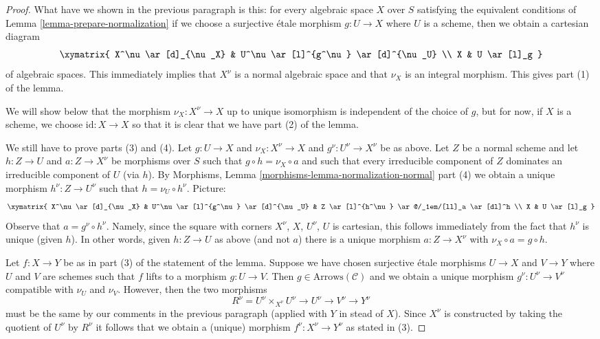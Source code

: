 \begin{proof}
\medskip\noindent
What have we shown in the previous paragraph is this: for every algebraic
space $X$ over $S$ satisfying the equivalent conditions of
Lemma \ref{lemma-prepare-normalization} if we choose a surjective \'etale
morphism $g : U \to X$ where $U$ is a scheme, then we obtain
a cartesian diagram
$$
\xymatrix{
X^\nu \ar[d]_{\nu_X} & U^\nu \ar[l]^{g^\nu} \ar[d]^{\nu_U} \\
X & U \ar[l]_g
}
$$
of algebraic spaces. This immediately implies that $X^\nu$ is a normal
algebraic space and that $\nu_X$ is an integral morphism. This gives
part (1) of the lemma.

\medskip\noindent
We will show below that the morphism $\nu_X : X^\nu \to X$
up to unique isomorphism is independent of the choice of $g$,
but for now, if $X$ is a scheme, we choose $\text{id} : X \to X$
so that it is clear that we have part (2) of the lemma.

\medskip\noindent
We still have to prove parts (3) and (4). Let $g : U \to X$ and
$\nu_X : X^\nu \to X$ and $g^\nu : U^\nu \to X^\nu$ be as above.
Let $Z$ be a normal scheme and let $h : Z \to U$ and $a : Z \to X^\nu$
be morphisms over $S$ such that $g \circ h = \nu_X \circ a$ and such that
every irreducible component of $Z$ dominates an irreducible component of $U$
(via $h$). By
Morphisms, Lemma \ref{morphisms-lemma-normalization-normal} part (4)
we obtain a unique morphism $h^\nu : Z \to U^\nu$ such
that $h = \nu_U \circ h^\nu$. Picture:
$$
\xymatrix{
X^\nu \ar[d]_{\nu_X} &
U^\nu \ar[l]^{g^\nu} \ar[d]^{\nu_U} &
Z \ar[l]^{h^\nu} \ar@/_1em/[ll]_a \ar[dl]^h
\\
X & U \ar[l]_g
}
$$
Observe that $a = g^\nu \circ h^\nu$. Namely, since the square with
corners $X^\nu$, $X$, $U^\nu$, $U$ is cartesian, this follows
immediately from the fact that $h^\nu$ is unique (given $h$).
In other words, given $h : Z \to U$ as above (and not $a$)
there is a unique morphism $a : Z \to X^\nu$ with
$\nu_X \circ a = g \circ h$.

\medskip\noindent
Let $f : X \to Y$ be as in part (3) of the statement of the lemma.
Suppose we have chosen surjective \'etale morphisms $U \to X$ and
$V \to Y$ where $U$ and $V$ are schemes such that $f$ lifts to a
morphism $g : U \to V$. Then $g \in \text{Arrows}(\mathcal{C})$
and we obtain a unique morphism $g^\nu : U^\nu \to V^\nu$ compatible
with $\nu_U$ and $\nu_V$. However, then the two morphisms
$$
R^\nu = U^\nu \times_{X^\nu} U^\nu
\to U^\nu \to V^\nu \to Y^\nu
$$
must be the same by our comments in the previous paragraph (applied
with $Y$ in stead of $X$).
Since $X^\nu$ is constructed by taking the quotient of
$U^\nu$ by $R^\nu$ it follows that we obtain a (unique)
morphism $f^\nu : X^\nu \to Y^\nu$ as stated in (3).


\end{proof}
